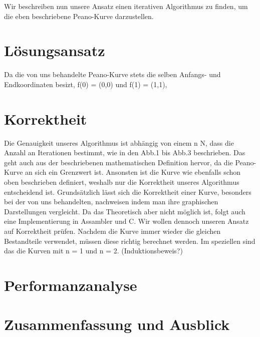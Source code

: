\documentclass[course=asp]{aspdoc}
\begin{document}

Wir beschreiben nun unsere Ansatz einen iterativen Algorithmus zu finden, um die eben beschriebene Peano-Kurve darzustellen. %

\newpage

\section{Lösungsansatz}
Da die von uns behandelte Peano-Kurve stets die selben Anfangs- und Endkoordinaten besizt, f(0) = (0,0) und f(1) = (1,1), 

\section{Korrektheit} %

Die Genauigkeit unseres Algorithmus ist abhängig von einem n \in N, dass die Anzahl an Iterationen bestimmt, wie in den Abb.1 bis Abb.3 beschrieben. Das geht auch aus der beschriebenen mathematischen Definition hervor, da die Peano-Kurve an sich ein Grenzwert ist. Ansonsten ist die Kurve wie ebenfalls schon oben beschrieben definiert, weshalb nur die Korrektheit unseres Algorithmus entscheidend ist.
Grundsätzlich lässt sich die Korrektheit einer Kurve, besonders bei der von uns behandelten, nachweisen indem man ihre graphischen Darstellungen vergleicht. Da das Theoretisch aber nicht möglich ist, folgt auch eine Implementierung in Assambler und C.
Wir wollen dennoch unseren Ansatz auf Korrektheit prüfen.
Nachdem die Kurve immer wieder die gleichen Bestandteile verwendet, müssen diese richtig berechnet werden. Im speziellen sind das die Kurven mit n = 1 und n = 2. (Induktionsbeweis?) 

\section{Performanzanalyse}


\section{Zusammenfassung und Ausblick}


{}
\end{document}
